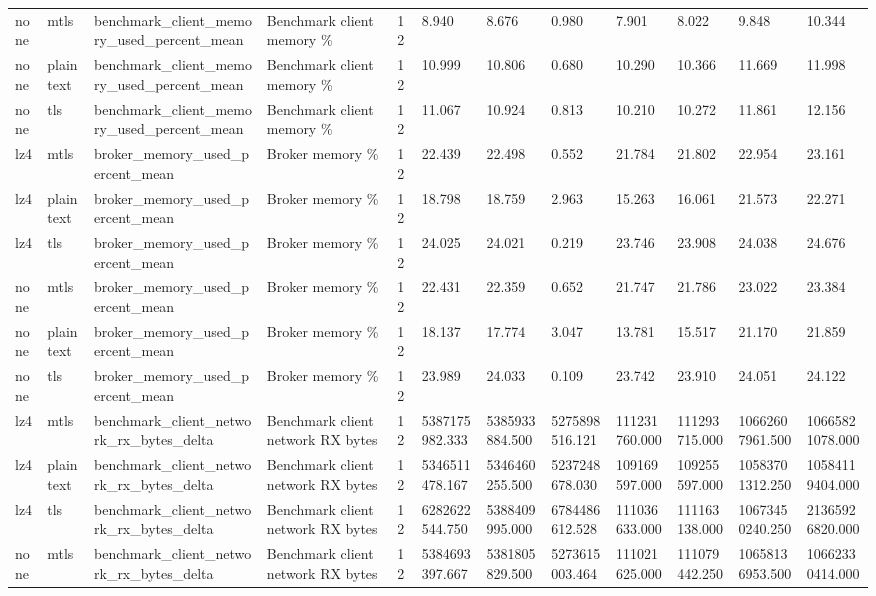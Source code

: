 \begin{longtable}{llllllllllll}
none & mtls & benchmark\_client\_memory\_used\_percent\_mean & Benchmark client memory \% & 12 & 8.940 & 8.676 & 0.980 & 7.901 & 8.022 & 9.848 & 10.344 \\
none & plaintext & benchmark\_client\_memory\_used\_percent\_mean & Benchmark client memory \% & 12 & 10.999 & 10.806 & 0.680 & 10.290 & 10.366 & 11.669 & 11.998 \\
none & tls & benchmark\_client\_memory\_used\_percent\_mean & Benchmark client memory \% & 12 & 11.067 & 10.924 & 0.813 & 10.210 & 10.272 & 11.861 & 12.156 \\
lz4 & mtls & broker\_memory\_used\_percent\_mean & Broker memory \% & 12 & 22.439 & 22.498 & 0.552 & 21.784 & 21.802 & 22.954 & 23.161 \\
lz4 & plaintext & broker\_memory\_used\_percent\_mean & Broker memory \% & 12 & 18.798 & 18.759 & 2.963 & 15.263 & 16.061 & 21.573 & 22.271 \\
lz4 & tls & broker\_memory\_used\_percent\_mean & Broker memory \% & 12 & 24.025 & 24.021 & 0.219 & 23.746 & 23.908 & 24.038 & 24.676 \\
none & mtls & broker\_memory\_used\_percent\_mean & Broker memory \% & 12 & 22.431 & 22.359 & 0.652 & 21.747 & 21.786 & 23.022 & 23.384 \\
none & plaintext & broker\_memory\_used\_percent\_mean & Broker memory \% & 12 & 18.137 & 17.774 & 3.047 & 13.781 & 15.517 & 21.170 & 21.859 \\
none & tls & broker\_memory\_used\_percent\_mean & Broker memory \% & 12 & 23.989 & 24.033 & 0.109 & 23.742 & 23.910 & 24.051 & 24.122 \\
lz4 & mtls & benchmark\_client\_network\_rx\_bytes\_delta & Benchmark client network RX bytes & 12 & 5387175982.333 & 5385933884.500 & 5275898516.121 & 111231760.000 & 111293715.000 & 10662607961.500 & 10665821078.000 \\
lz4 & plaintext & benchmark\_client\_network\_rx\_bytes\_delta & Benchmark client network RX bytes & 12 & 5346511478.167 & 5346460255.500 & 5237248678.030 & 109169597.000 & 109255597.000 & 10583701312.250 & 10584119404.000 \\
lz4 & tls & benchmark\_client\_network\_rx\_bytes\_delta & Benchmark client network RX bytes & 12 & 6282622544.750 & 5388409995.000 & 6784486612.528 & 111036633.000 & 111163138.000 & 10673450240.250 & 21365926820.000 \\
none & mtls & benchmark\_client\_network\_rx\_bytes\_delta & Benchmark client network RX bytes & 12 & 5384693397.667 & 5381805829.500 & 5273615003.464 & 111021625.000 & 111079442.250 & 10658136953.500 & 10662330414.000 \\

\end{longtable}
